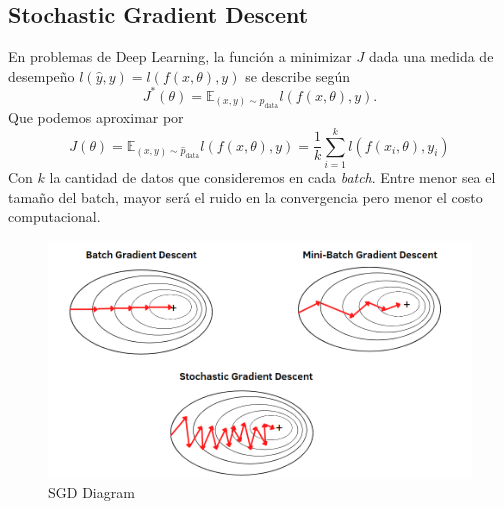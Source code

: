 \subsection{Stochastic Gradient Descent}

En problemas de Deep Learning, la función a minimizar $J$ dada una medida de desempeño $l(\hat{y},y) = l(f(x , \theta),y)$ se describe según 
$$ 
J^{*}(\theta) = \mathbb{E}_{(x,y) \sim p_{\text{data}}} l(f(x , \theta),y) .
$$
Que podemos aproximar por 
$$
J(\theta) = \mathbb{E}_{(x,y) \sim \hat{p}_{\text{data}}} l(f(x , \theta),y) = \frac{1}{k}\sum_{i=1}^{k}l(f(x_i , \theta),y_i)
$$
Con $k$ la cantidad de datos que consideremos en cada \textit{batch}. Entre menor sea el tamaño del batch, mayor será el ruido en la convergencia pero menor el costo computacional.

\begin{figure}[H]
    \center
    \includegraphics[scale=0.25]{notebooks/DL/img/sgd_diagram.png}
    \caption{SGD Diagram}
\end{figure}

